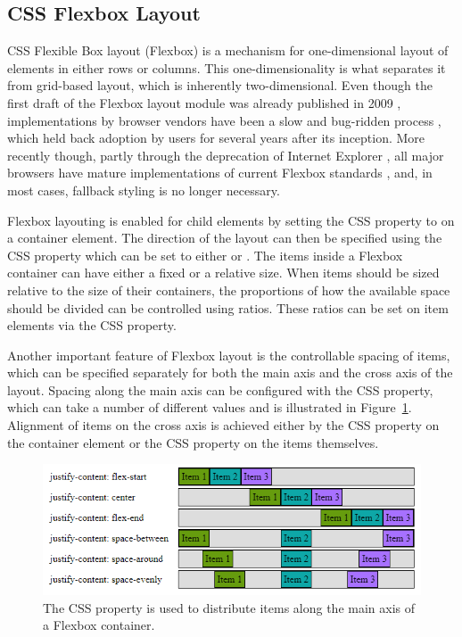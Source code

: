 \subsection{CSS Flexbox Layout}
\label{sec:Flexbox}

CSS Flexible Box layout (Flexbox) \parencite{CSSFlexbox} is a
mechanism for one-dimensional layout of elements in either rows or
columns. This one-dimensionality is what separates it from grid-based
layout, which is inherently two-dimensional.
%
Even though the first draft of the Flexbox layout module was already
published in 2009 \parencite{CSSFlexboxFirstDraft}, implementations by
browser vendors have been a slow and bug-ridden process
\parencite{CanIUseCSSFlexbox}, which held back adoption by users for
several years after its inception. More recently though, partly
through the deprecation of Internet Explorer
\parencite{IEDeprecation}, all major browsers have mature
implementations of current Flexbox standards \parencite{CSSFlexbox},
and, in most cases, fallback styling is no longer necessary.

Flexbox layouting is enabled for child elements by setting the CSS
 property to  on a container element. The
direction of the layout can then be specified using the CSS
 property which can be set to either
 or .
%
The items inside a Flexbox container can have either a fixed or a
relative size. When items should be sized relative to the size of
their containers, the proportions of how the available space should be
divided can be controlled using ratios. These ratios can be set on
item elements via the CSS  property.

Another important feature of Flexbox layout is the controllable
spacing of items, which can be specified separately for both the main
axis and the cross axis of the layout. Spacing along the main axis can
be configured with the CSS  property, which
can take a number of different values and is illustrated in
Figure~\ref{fig:FlexboxJustifyContent}. Alignment of items on the
cross axis is achieved either by the CSS 
property on the container element or the CSS 
property on the items themselves.

\begin{figure}[tp]
\centering
\includegraphics[keepaspectratio,width=\linewidth,height=\thirdh]
{images/flexbox-justify-content.png}
\caption[Flexbox CSS  Property]{
The CSS  property is used to distribute
items along the main axis of a Flexbox container. 
}
\label{fig:FlexboxJustifyContent}
\end{figure}


